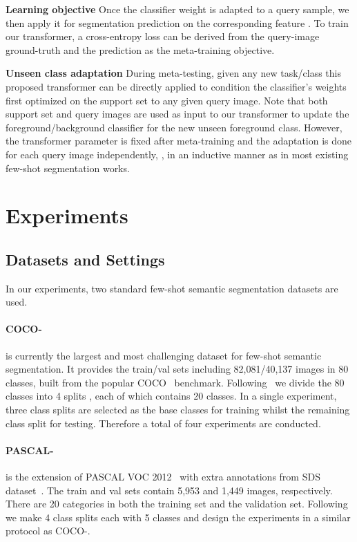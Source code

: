 \documentclass[10pt,twocolumn,letterpaper]{article}
\begin{document}
{\bf Learning objective }
Once the classifier weight  is adapted to a query sample,
we then apply it for segmentation prediction on the corresponding feature
.
To train our transformer,
a cross-entropy loss can be derived from the query-image ground-truth and the prediction as the meta-training objective.


{\bf Unseen class adaptation }
During meta-testing, given any new task/class this proposed transformer can be directly applied 
to condition the classifier's weights first optimized on the support set to any given query image. Note that both support set and query images are used as input to our transformer to update the foreground/background classifier for the new unseen foreground class. However, the transformer parameter is fixed after meta-training and the adaptation is done for each query image independently, \ie, in an inductive manner as in most existing few-shot segmentation works. 



\section{Experiments}
\label{sec:exp}

\subsection{Datasets and Settings}
In our experiments, two standard few-shot semantic segmentation datasets are used.
\vspace{-0.4cm}

\paragraph{COCO-} is currently the largest and most challenging dataset for few-shot semantic segmentation. 
It provides the train/val sets including 82,081/40,137 images in 80 classes, built from the popular COCO~\cite{lin2014microsoft} benchmark. Following~\cite{nguyen2019feature} we divide the 80 classes into 4 splits , each of which contains 20 classes. In a single experiment, three class splits are selected as the base classes for training whilst the remaining class split for testing. 
Therefore a total of four experiments are conducted.

\vspace{-0.4cm}



\paragraph{PASCAL-} is the extension of PASCAL VOC 2012~\cite{everingham2010pascal} with extra annotations from SDS dataset~\cite{hariharan2014simultaneous}. The train and val sets contain 5,953 and 1,449 images, respectively. There are 20 categories in both the training set and the validation set. 
Following~\cite{shaban2017one} we make 4 class splits each with 5 classes and design the experiments in a similar protocol as COCO-.
\end{document}

